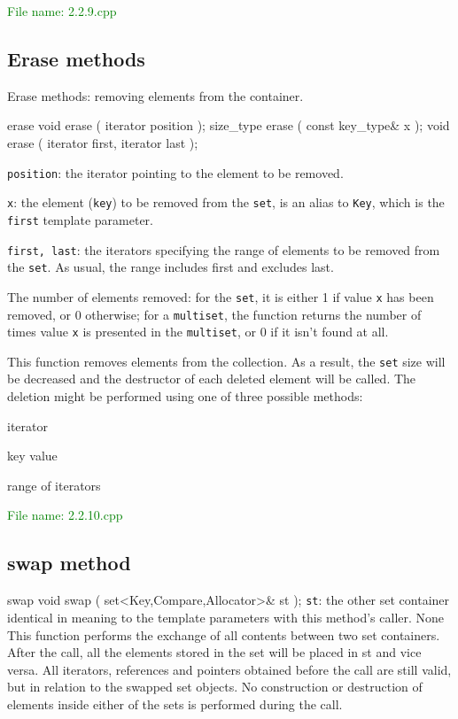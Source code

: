 \textcolor{green}{File name: 2.2.9.cpp} 
 

\subsection{Erase methods} %
Erase methods: removing elements from the container.
\begin{methodinfo}
  {erase}
  {void erase ( iterator position );
  size_type erase ( const key_type& x );
  void erase ( iterator first, iterator last );}
  {\texttt{position}: the iterator pointing to the element to be removed. 

  \texttt{x}: the element (\texttt{key}) to be removed from the \texttt{set},  
  is an alias to \texttt{Key}, which is the \texttt{first} template parameter.

  \texttt{first, last}: the iterators specifying the range of elements to be removed from the \texttt{set}. 
  As usual, the range includes first and excludes last.}
  {The number of elements removed: for the \texttt{set}, it is either 1 if value \texttt{x} has been removed, 
  or 0 otherwise; for a \texttt{multiset}, the function returns the number of times value \texttt{x} is 
  presented in the \texttt{multiset}, or 0 if it isn’t found at all.}
  {This function removes elements from the collection. As a result, the \texttt{set} size will be decreased 
  and the destructor of each deleted element will be called. The deletion might be performed using one of 
  three possible methods:
  
  iterator
  
  key value
  
  range of iterators}
\end{methodinfo}

\textcolor{green}{File name: 2.2.10.cpp} 
 

\subsection{swap method} %
\begin{methodinfo}
  {swap}
  {void swap ( set<Key,Compare,Allocator>& st );}
  {\texttt{st}: the other set container identical in meaning to the template parameters with this method’s caller.}
  {None}
  {This function performs the exchange of all contents between two set containers. After the call, all the elements stored in the set will be placed in st and vice versa. All iterators, references and pointers obtained before the call are still valid, but in relation to the swapped set objects. No construction or destruction of elements inside either of the sets is performed during the call.}
\end{methodinfo}

